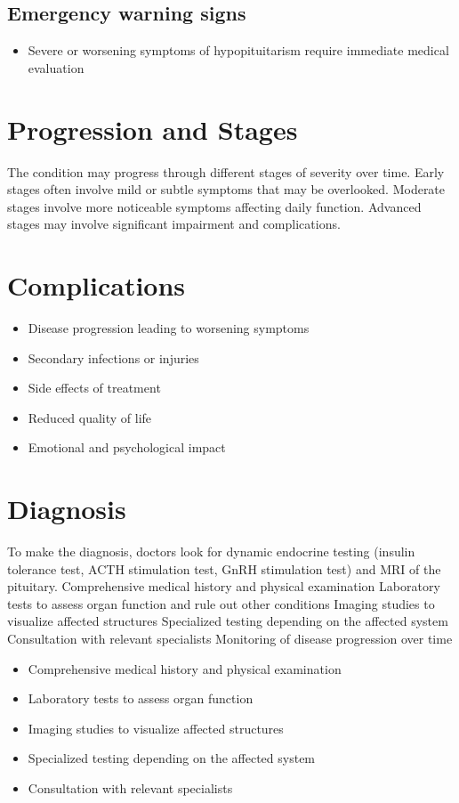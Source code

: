 \subsection{Emergency warning signs}
\begin{itemize}[noitemsep]
  \item Severe or worsening symptoms of hypopituitarism require immediate medical evaluation
\end{itemize}
\section{Progression and Stages}
The condition may progress through different stages of severity over time. Early stages often involve mild or subtle symptoms that may be overlooked. Moderate stages involve more noticeable symptoms affecting daily function. Advanced stages may involve significant impairment and complications.
\section{Complications}
\begin{itemize}[noitemsep]
  \item Disease progression leading to worsening symptoms
  \item Secondary infections or injuries
  \item Side effects of treatment
  \item Reduced quality of life
  \item Emotional and psychological impact
\end{itemize}
\section{Diagnosis}
To make the diagnosis, doctors look for dynamic endocrine testing (insulin tolerance test, ACTH stimulation test, GnRH stimulation test) and MRI of the pituitary. Comprehensive medical history and physical examination Laboratory tests to assess organ function and rule out other conditions Imaging studies to visualize affected structures Specialized testing depending on the affected system Consultation with relevant specialists Monitoring of disease progression over time

\begin{itemize}[noitemsep]
  \item Comprehensive medical history and physical examination
  \item Laboratory tests to assess organ function
  \item Imaging studies to visualize affected structures
  \item Specialized testing depending on the affected system
  \item Consultation with relevant specialists
\end{itemize}
